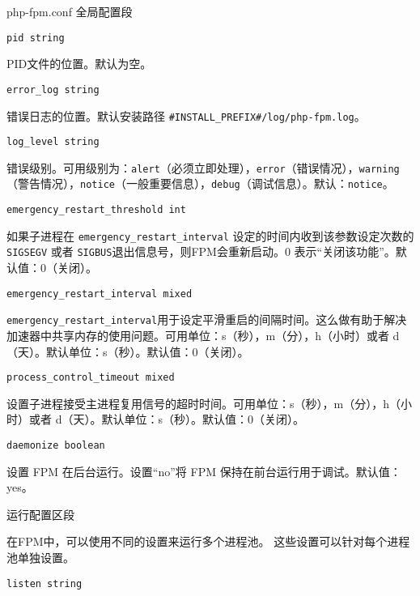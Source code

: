\begin{compactitem}
\item php-fpm.conf 全局配置段

\begin{compactitem}
\item \texttt{pid string}

PID文件的位置。默认为空。

\item \texttt{error\_log string}

错误日志的位置。默认安装路径 \texttt{\#INSTALL\_PREFIX\#/log/php-fpm.log}。

\item \texttt{log\_level string}

错误级别。可用级别为：\texttt{alert}（必须立即处理），\texttt{error}（错误情况），\texttt{warning}（警告情况），\texttt{notice}（一般重要信息），\texttt{debug}（调试信息）。默认：\texttt{notice}。

\item \texttt{emergency\_restart\_threshold int}

如果子进程在 \texttt{emergency\_restart\_interval} 设定的时间内收到该参数设定次数的 \texttt{SIGSEGV} 或者 \texttt{SIGBUS}退出信息号，则FPM会重新启动。0 表示“关闭该功能”。默认值：0（关闭）。

\item \texttt{emergency\_restart\_interval mixed}

\texttt{emergency\_restart\_interval}用于设定平滑重启的间隔时间。这么做有助于解决加速器中共享内存的使用问题。可用单位：s（秒），m（分），h（小时）或者 d（天）。默认单位：s（秒）。默认值：0（关闭）。

\item \texttt{process\_control\_timeout mixed}

设置子进程接受主进程复用信号的超时时间。可用单位：s（秒），m（分），h（小时）或者 d（天）。默认单位：s（秒）。默认值：0（关闭）。

\item \texttt{daemonize boolean}

设置 FPM 在后台运行。设置“no”将 FPM 保持在前台运行用于调试。默认值：yes。

\end{compactitem}

\item 运行配置区段

在FPM中，可以使用不同的设置来运行多个进程池。 这些设置可以针对每个进程池单独设置。

\begin{compactitem}
\item \texttt{listen string}


\end{compactitem}
\end{compactitem}
